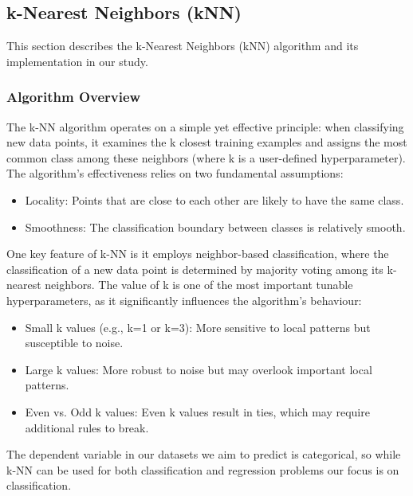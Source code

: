 \subsection{k-Nearest Neighbors (kNN)}
\label{subsec:methods-knn}

This section describes the k-Nearest Neighbors (kNN) algorithm and its implementation in our study.


\subsubsection{Algorithm Overview}

The k-NN algorithm operates on a simple yet effective principle: when classifying new data points, 
it examines the k closest training examples and assigns the most common class among these neighbors (where k is a user-defined hyperparameter). 
The algorithm's effectiveness relies on two fundamental assumptions:
\begin{itemize}
    \item Locality: Points that are close to each other are likely to have the same class.
    \item Smoothness: The classification boundary between classes is relatively smooth.
\end{itemize}

One key feature of k-NN is it employs neighbor-based classification, where the classification of a new data point 
is determined by majority voting among its k-nearest neighbors. 
The value of k is one of the most important tunable hyperparameters, as it significantly influences the algorithm's behaviour:
\begin{itemize}
    \item Small k values (e.g., k=1 or k=3): More sensitive to local patterns but susceptible to noise.
    \item Large k values: More robust to noise but may overlook important local patterns.
    \item Even vs. Odd k values: Even k values result in ties, which may require additional rules to break.
\end{itemize}

The dependent variable in our datasets we aim to predict is categorical, so while k-NN can be used for both classification and regression problems 
our focus is on classification.

